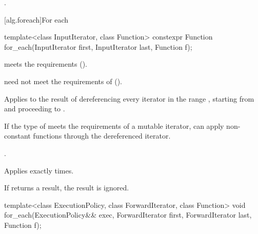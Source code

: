 \begin{itemdescr}
\pnum
\returns
{}.
\end{itemdescr}

[alg.foreach]{For each}

%
\begin{itemdecl}
template<class InputIterator, class Function>
  constexpr Function for_each(InputIterator first, InputIterator last, Function f);
\end{itemdecl}

\begin{itemdescr}
\pnum
\expects
{} meets
the  requirements ().
\begin{note}
 need not meet the requirements of
 ().
\end{note}

\pnum
\effects
Applies  to the result of dereferencing
every iterator in the range ,
starting from  and proceeding to .
\begin{note}
If the type of  meets the requirements of a mutable iterator,
 can apply non-constant functions through the dereferenced iterator.
\end{note}

\pnum
\returns
{}.

\pnum
\complexity
Applies  exactly  times.

\pnum
\remarks
If  returns a result, the result is ignored.
\end{itemdescr}

%
\begin{itemdecl}
template<class ExecutionPolicy, class ForwardIterator, class Function>
  void for_each(ExecutionPolicy&& exec,
                ForwardIterator first, ForwardIterator last,
                Function f);
\end{itemdecl}

